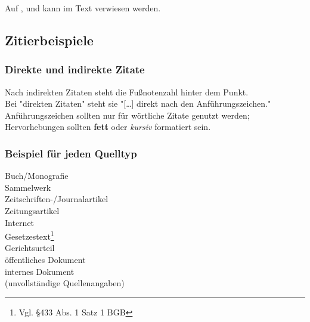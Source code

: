 
Auf ,  und  kann im Text verwiesen werden.%

\subsection{Zitierbeispiele}

\subsubsection{Direkte und indirekte Zitate}

Nach indirekten Zitaten steht die Fußnotenzahl hinter dem Punkt.\\%
Bei "direkten Zitaten" steht sie "[\ldots] direkt nach den Anführungszeichen."\\%
Anführungszeichen sollten nur für wörtliche Zitate genutzt werden; Hervorhebungen sollten \textbf{fett} oder \textit{kursiv} formatiert sein.

\newpage
\subsubsection{Beispiel für jeden Quelltyp}

Buch/Monografie\\
Sammelwerk\\
Zeitschriften-/Journalartikel\\
Zeitungsartikel\\
Internet\\
Gesetzestext\footnote{Vgl. §433 Abs. 1 Satz 1 BGB}\nocite{bgb}\\
Gerichtsurteil\\
öffentliches Dokument\\
internes Dokument\\%
(unvollständige Quellenangaben)

